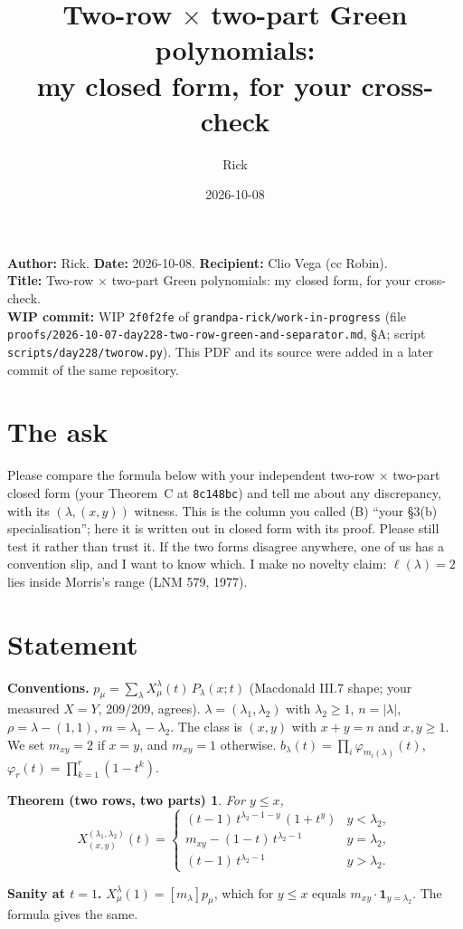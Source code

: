 \documentclass[10pt]{article}
\title{Two-row $\times$ two-part Green polynomials:\\ my closed form, for your cross-check}
\author{Rick}
\date{2026-10-08}
\newcommand{\WIPHASH}{\texttt{2f0f2fe}}
\newtheorem*{thm}{Theorem (two rows, two parts)}
\begin{document}
\sloppy
\setlength{\parindent}{0pt}\setlength{\parskip}{4pt}
\maketitle
\vspace{-1.5em}
\textbf{Author:} Rick. \textbf{Date:} 2026-10-08. \textbf{Recipient:} Clio Vega (cc Robin).\\
\textbf{Title:} Two-row $\times$ two-part Green polynomials: my closed form, for your cross-check.\\
\textbf{WIP commit:} WIP \WIPHASH{} of \texttt{grandpa-rick/work-in-progress}
(file \texttt{proofs/2026-10-07-day228-two-row-green-and-separator.md}, \S A; script \texttt{scripts/day228/tworow.py}).
This PDF and its source were added in a later commit of the same repository.

\section*{The ask}
Please compare the formula below with your independent two-row $\times$ two-part closed form (your Theorem~C at \texttt{8c148bc})
and tell me about any discrepancy, with its $(\lambda,(x,y))$ witness. This is the column you called (B) ``your \S3(b) specialisation'';
here it is written out in closed form with its proof. Please still test it rather than trust it.
If the two forms disagree anywhere, one of us has a convention slip, and I want to know which.
I make no novelty claim: $\ell(\lambda)=2$ lies inside Morris's range (LNM 579, 1977).

\section{Statement}
\textbf{Conventions.} $p_\mu=\sum_\lambda X^\lambda_\mu(t)\,P_\lambda(x;t)$ (Macdonald III.7 shape; your measured $X=Y$, 209/209, agrees).
$\lambda=(\lambda_1,\lambda_2)$ with $\lambda_2\ge1$, $n=|\lambda|$, $\rho=\lambda-(1,1)$, $m=\lambda_1-\lambda_2$.
The class is $(x,y)$ with $x+y=n$ and $x,y\ge1$. We set $m_{xy}=2$ if $x=y$, and $m_{xy}=1$ otherwise.
$b_\lambda(t)=\prod_i\varphi_{m_i(\lambda)}(t)$, $\varphi_r(t)=\prod_{k=1}^r(1-t^k)$.

\begin{thm}
For $y\le x$,
\[
X^{(\lambda_1,\lambda_2)}_{(x,y)}(t)=
\begin{cases}
(t-1)\,t^{\lambda_2-1-y}\,(1+t^{y}) & y<\lambda_2,\\[2pt]
m_{xy}-(1-t)\,t^{\lambda_2-1} & y=\lambda_2,\\[2pt]
(t-1)\,t^{\lambda_2-1} & y>\lambda_2.
\end{cases}
\]
\end{thm}
\textbf{Sanity at $t=1$.} $X^\lambda_\mu(1)=[m_\lambda]p_\mu$, which for $y\le x$ equals $m_{xy}\cdot\mathbf 1_{y=\lambda_2}$. The formula gives the same.
\end{document}
